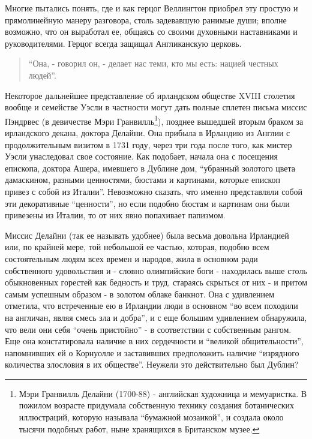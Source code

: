 \documentclass[
  oneside,
  12pt,
  titlepage]{book}
\begin{document}
Многие пытались понять, где и как герцог Веллингтон приобрел эту простую и прямолинейную манеру разговора, столь задевавшую ранимые души; вполне возможно, что он выработал ее, общаясь со своими духовными наставниками и руководителями. Герцог всегда защищал Англиканскую церковь.

\begin{quote}
``Она, - говорил он, - делает нас теми, кто мы есть: нацией честных людей''.
\end{quote}

Некоторое дальнейшее представление об ирландском обществе XVIII столетия вообще и семействе Уэсли в частности могут дать полные сплетен письма миссис Пэндрвес (в девичестве Мэри Гранвилль\footnote{Мэри Гранвилль Делайни (1700-88) - английская художница и мемуаристка. В пожилом возрасте придумала собственную технику создания ботанических иллюстраций, которую называла ``бумажной мозаикой'', и создала около тысячи подобных работ, ныне хранящихся в Британском музее.}), позднее вышедшей вторым браком за ирландского декана, доктора Делайни. Она прибыла в Ирландию из Англии с продолжительным визитом в 1731 году, через три года после того, как мистер Уэсли унаследовал свое состояние. Как подобает, начала она с посещения епископа, доктора Ашера, имевшего в Дублине дом, ``убранный золотого цвета дамаскином, разными ценностями, бюстами и картинами, которые епископ привез с собой из Италии''. Невозможно сказать, что именно представляли собой эти декоративные ``ценности'', но если подобно бюстам и картинам они были привезены из Италии, то от них явно попахивает папизмом.

Миссис Делайни (так ее называть удобнее) была весьма довольна Ирландией или, по крайней мере, той небольшой ее частью, которая, подобно всем состоятельным людям всех времен и народов, жила в основном ради собственного удовольствия и - словно олимпийские боги - находилась выше столь обыкновенных горестей как бедность и труд, стараясь скрыться от них - и притом самым успешным образом - в золотом облаке банкнот. Она с удивлением отметила, что встреченные ею в Ирландии люди в основном ``во всем походили на англичан, являя смесь зла и добра'', и с еще большим удивлением обнаружила, что вели они себя ``очень пристойно'' - в соответствии с собственным рангом. Еще она констатировала наличие в них сердечности и ``великой общительности'', напомнивших ей о Корнуолле и заставивших предположить наличие ``изрядного количества злословия в их обществе''. Неужели это действительно был Дублин?
\end{document}
